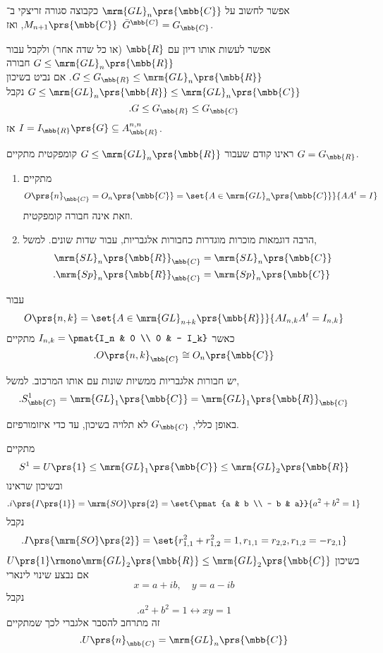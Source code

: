 \documentclass[10pt, twoside]{book}
\begin{document}

\begin{remark}
אפשר לחשוב על
$\mrm{GL}_n\prs{\mbb{C}}$
כקבוצה סגורה זריצקי ב־%
$M_{n+1}\prs{\mbb{C}}$,
ואז
$\bar{G}^{\mbb{C}} = G_{\mbb{C}}$.
\end{remark}

אפשר לעשות אותו דיון עם
$\mbb{R}$
(או כל שדה אחר) ולקבל
עבור
$G \leq \mrm{GL}_n\prs{\mbb{R}}$
חבורה
$G \leq G_{\mbb{R}} \leq \mrm{GL}_n\prs{\mbb{R}}$.
אם נביט בשיכון
$G \leq \mrm{GL}_n\prs{\mbb{R}} \leq \mrm{GL}_n\prs{\mbb{C}}$
נקבל
\[\text{.} G \leq G_{\mbb{R}} \leq G_{\mbb{C}}\]
אז
$I = I_{\mbb{R}}\prs{G} \subseteq A_{\mbb{R}}^{n,n}$.

ראינו קודם שעבור
$G \leq \mrm{GL}_n\prs{\mbb{R}}$
קומפקטית מתקיים
$G = G_{\mbb{R}}$.

\begin{example}
\begin{enumerate}
\item מתקיים
\[O\prs{n}_{\mbb{C}} = O_n\prs{\mbb{C}} = \set{A \in \mrm{GL}_n\prs{\mbb{C}}}{A A^t = I}\]
וזאת אינה חבורה קומפקטית.
\item הרבה דוגמאות מוכרות מוגדרות כחבורות אלגבריות, עבור שדות שונים.
למשל,
\begin{align*}
\mrm{SL}_n\prs{\mbb{R}}_{\mbb{C}} &= \mrm{SL}_n\prs{\mbb{C}} \\
\text{.}\mrm{Sp}_n\prs{\mbb{R}}_{\mbb{C}} &= \mrm{Sp}_n\prs{\mbb{C}}
\end{align*}
\end{enumerate}
\end{example}

\begin{exercise}
עבור
\[O\prs{n,k} = \set{A \in \mrm{GL}_{n+k}\prs{\mbb{R}}}{A I_{n,k} A^t = I_{n,k}}\]
כאשר
$I_{n,k} = \pmat{I_n & 0 \\ 0 & - I_k}$
מתקיים
\[\text{.} O\prs{n,k}_{\mbb{C}} \cong O_n\prs{\mbb{C}}\]
\end{exercise}

\begin{remark}
יש חבורות אלגבריות ממשיות שונות עם אותו המרכוב. למשל,
\[\text{.}S^1_{\mbb{C}} = \mrm{GL}_1\prs{\mbb{C}} = \mrm{GL}_1\prs{\mbb{R}}_{\mbb{C}}\]
\end{remark}

\begin{remark}
באופן כללי,
$G_{\mbb{C}}$
לא תלויה בשיכון, עד כדי איזומורפיזם.
\end{remark}

\begin{example}
מתקיים
\[S^1 = U\prs{1} \leq \mrm{GL}_1\prs{\mbb{C}} \leq \mrm{GL}_2\prs{\mbb{R}}\]
ובשיכון שראינו
\[\text{.} i\prs{I\prs{1}} = \mrm{SO}\prs{2} = \set{\pmat{a & b \\ - b & a}}{a^2 + b^2 = 1}\]
נקבל
\[\text{.}I\prs{\mrm{SO}\prs{2}} = \set{r_{1,1}^2 + r_{1,2}^2 = 1, r_{1,1} = r_{2,2}, r_{1,2} = -r_{2,1}}\]
בשיכון
$U\prs{1} \rmono \mrm{GL}_2\prs{\mbb{R}} \leq \mrm{GL}_2\prs{\mbb{C}}$
אם נבצע שינוי לינארי
\[x = a+ib, \quad y = a-ib\]
נקבל
\[\text{.} a^2 + b^2 = 1 \leftrightarrow xy = 1\]
זה מתרחב להסבר אלגברי לכך שמתקיים
\[\text{.} U\prs{n}_{\mbb{C}} = \mrm{GL}_n\prs{\mbb{C}}\]
\end{example}
\end{document}
